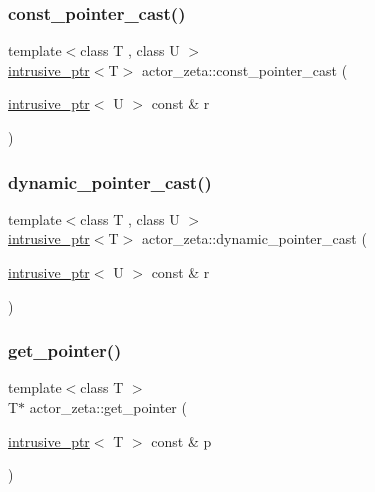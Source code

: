 \subsubsection{\texorpdfstring{const\+\_\+pointer\+\_\+cast()}{const\_pointer\_cast()}}
{\footnotesize\ttfamily template$<$class T , class U $>$ \\
\hyperlink{classactor__zeta_1_1intrusive__ptr}{intrusive\+\_\+ptr}$<$T$>$ actor\+\_\+zeta\+::const\+\_\+pointer\+\_\+cast (\begin{DoxyParamCaption}\item[{\hyperlink{classactor__zeta_1_1intrusive__ptr}{intrusive\+\_\+ptr}$<$ U $>$ const \&}]{r }\end{DoxyParamCaption})\hspace{0.3cm}{\ttfamily [noexcept]}}

\mbox{\label{namespaceactor__zeta_aa7fcd42040b14e3cb112d92f38564e9c}} 
\subsubsection{\texorpdfstring{dynamic\+\_\+pointer\+\_\+cast()}{dynamic\_pointer\_cast()}}
{\footnotesize\ttfamily template$<$class T , class U $>$ \\
\hyperlink{classactor__zeta_1_1intrusive__ptr}{intrusive\+\_\+ptr}$<$T$>$ actor\+\_\+zeta\+::dynamic\+\_\+pointer\+\_\+cast (\begin{DoxyParamCaption}\item[{\hyperlink{classactor__zeta_1_1intrusive__ptr}{intrusive\+\_\+ptr}$<$ U $>$ const \&}]{r }\end{DoxyParamCaption})\hspace{0.3cm}{\ttfamily [noexcept]}}

\mbox{\label{namespaceactor__zeta_a52fbdab9c41eaeb960819e652c5b6d50}} 
\subsubsection{\texorpdfstring{get\+\_\+pointer()}{get\_pointer()}}
{\footnotesize\ttfamily template$<$class T $>$ \\
T$\ast$ actor\+\_\+zeta\+::get\+\_\+pointer (\begin{DoxyParamCaption}\item[{\hyperlink{classactor__zeta_1_1intrusive__ptr}{intrusive\+\_\+ptr}$<$ T $>$ const \&}]{p }\end{DoxyParamCaption})\hspace{0.3cm}{\ttfamily [noexcept]}}

